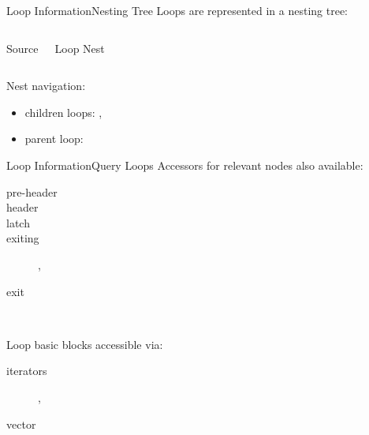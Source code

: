 \begin{frame}{Loop Information}{Nesting Tree}
Loops are represented in a \alert{nesting tree}:

\begin{columns}[t]
\begin{block}{Source}
\centering
{}
\end{block}

\begin{block}{Loop Nest}
\centering

\end{block}
\end{columns}

Nest navigation:

\begin{itemize}
\item children loops: ,
\item parent loop: 
\end{itemize}
\end{frame}

\begin{frame}{Loop Information}{Query Loops}
Accessors for relevant nodes also available:

\begin{description}
\item[pre-header] 
\item[header] 
\item[latch] 
\item[exiting] , \\
\item[exit]  \\
\end{description}

\vfill
Loop basic blocks accessible via:

\begin{description}
\item[iterators] , \\
\item[vector]
\end{description}
\end{frame}



